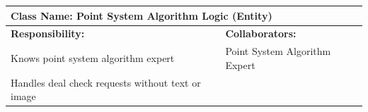 \documentclass[]{article}
\begin{document}
\begin{table}[H]
  \centering
  \renewcommand{\arraystretch}{1.3} %
  \begin{tabular}{|p{7.5cm}|p{7.5cm}|}
    \hline
    \multicolumn{2}{|l|}{\textbf{Class Name: Point System Algorithm Logic (Entity)}} \\
    \hline
    \textbf{Responsibility:}            & \textbf{Collaborators:}     \\
    \hline
    Knows point system algorithm expert & Point System Algorithm Expert \\
    Handles deal check requests without text or image& \\
    \hline
  \end{tabular}
\end{table}
\end{document}
